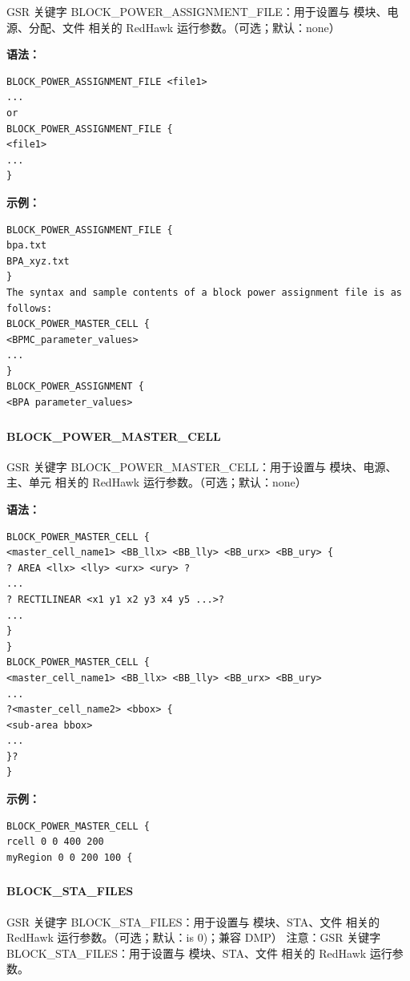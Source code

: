 GSR 关键字 BLOCK_POWER_ASSIGNMENT_FILE：用于设置与 模块、电源、分配、文件 相关的 RedHawk 运行参数。（可选；默认：none）

\textbf{语法：}
\begin{lstlisting}
BLOCK_POWER_ASSIGNMENT_FILE <file1>
...
or
BLOCK_POWER_ASSIGNMENT_FILE {
<file1>
...
}
\end{lstlisting}

\textbf{示例：}
\begin{lstlisting}
BLOCK_POWER_ASSIGNMENT_FILE {
bpa.txt
BPA_xyz.txt
}
The syntax and sample contents of a block power assignment file is as follows:
BLOCK_POWER_MASTER_CELL {
<BPMC_parameter_values>
...
}
BLOCK_POWER_ASSIGNMENT {
<BPA parameter_values>
\end{lstlisting}

\subsubsection{}
\paragraph*{BLOCK_POWER_MASTER_CELL}

GSR 关键字 BLOCK_POWER_MASTER_CELL：用于设置与 模块、电源、主、单元 相关的 RedHawk 运行参数。（可选；默认：none）

\textbf{语法：}
\begin{lstlisting}
BLOCK_POWER_MASTER_CELL {
<master_cell_name1> <BB_llx> <BB_lly> <BB_urx> <BB_ury> {
? AREA <llx> <lly> <urx> <ury> ?
...
? RECTILINEAR <x1 y1 x2 y3 x4 y5 ...>?
...
}
}
BLOCK_POWER_MASTER_CELL {
<master_cell_name1> <BB_llx> <BB_lly> <BB_urx> <BB_ury>
...
?<master_cell_name2> <bbox> {
<sub-area bbox>
...
}?
}
\end{lstlisting}

\textbf{示例：}
\begin{lstlisting}
BLOCK_POWER_MASTER_CELL {
rcell 0 0 400 200
myRegion 0 0 200 100 {
\end{lstlisting}

\subsubsection{}
\paragraph*{BLOCK_STA_FILES}

GSR 关键字 BLOCK_STA_FILES：用于设置与 模块、STA、文件 相关的 RedHawk 运行参数。（可选；默认：is 0)；兼容 DMP） 注意：GSR 关键字 BLOCK_STA_FILES：用于设置与 模块、STA、文件 相关的 RedHawk 运行参数。

